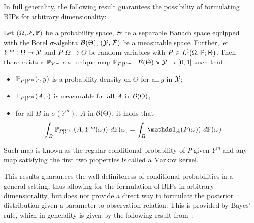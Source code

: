 In full generality, the following result guarantees the possibility of formulating BIPs for arbitrary dimensionality:
\begin{thm} 
    Let $ (\Omega, \mathcal F , \mathbb P) $ be a probability space, $\Theta$ be a separable Banach space equipped with the Borel $\sigma$-algebra $\mathcal B (\Theta)$, $(\mathcal Y, \tilde{\mathcal F})$ be a measurable space.
    Further, let $Y^m:\Omega \rightarrow \mathcal Y$ and $P : \Omega \rightarrow \Theta$ be random variables with $P \in L^1(\Omega, \mathbb P; \Theta) $. \newline
    Then there exists a $\mathbb P_{Y^m}$-a.s. unique map $\mathbb P_{P \mid Y^m} : \mathcal B (\Theta) \times \mathcal Y \rightarrow [0,1] $ such that :
    \begin{itemize}
        \item $\mathbb P_{P \mid Y^m}(\cdot, y)$ is a probability density on $\Theta$ for all $y$ in $\mathcal Y$;
        \item $\mathbb P_{P \mid Y^m}(A, \cdot)$ is measurable for all $A$ in $\mathcal B (\Theta)$;
        \item for all $B$ in $\sigma(Y^m)$, $A$ in $\mathcal B (\Theta)$, it holds that
                \[ 
                \int_B \bb P_{P \mid Y^m}(A, Y^m(\omega)) \ d\bb P(\omega)= \int_B \ind_A(P(\omega)) \ d\bb P(\omega).
                \] 
    \end{itemize}
    Such map is known as the regular conditional probability of $P$ given $Y^m$ and any map satisfying the first two properties is called a Markov kernel.
\end{thm}

This results guarantees the well-definiteness of conditional probabilities in a general setting, thus allowing for the formulation of BIPs in arbitrary dimensionality, but does not provide a direct way to formulate the posterior distribution given a parameter-to-observation relation. 
This is provided by Bayes' rule, which in generality is given by the following result from~\cite[Theorem 14]{DashtiStuart2017}:

